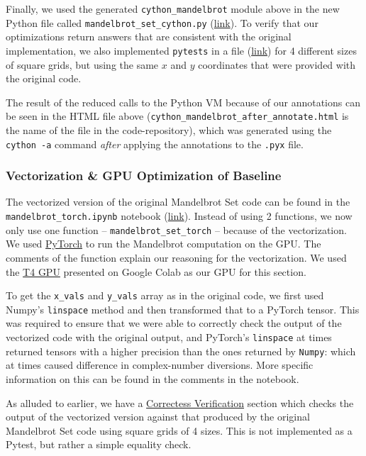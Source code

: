 \documentclass[a4paper,12pt]{article}
\begin{document}
Finally, we used the generated \verb|cython_mandelbrot| module above in the new Python file called \verb|mandelbrot_set_cython.py| (\href{https://github.com/paulmyr/DD2358-HPC25/blob/master/03_compgpu/bonus/mandelbrot_set_cython.py}{link}). To verify that our optimizations return answers that are consistent with the original implementation, we also implemented \verb|pytests| in a file (\href{https://github.com/paulmyr/DD2358-HPC25/blob/master/03_compgpu/bonus/mandelbrot_cython_default_test.py}{link}) for 4 different sizes of square grids, but using the same $x$ and $y$ coordinates that were provided with the original code. 

The result of the reduced calls to the Python VM because of our annotations can be seen in the HTML file above (\verb|cython_mandelbrot_after_annotate.html| is the name of the file in the code-repository), which was generated using the \verb|cython -a| command \textit{after} applying the annotations to the \verb|.pyx| file.

\subsubsection{Vectorization \& GPU Optimization of Baseline}
The vectorized version of the original Mandelbrot Set code can be found in the \verb|mandelbrot_torch.ipynb| notebook (\href{https://github.com/paulmyr/DD2358-HPC25/blob/master/03_compgpu/bonus/mandelbrot_torch.ipynb}{link}). Instead of using 2 functions, we now only use one function -- \verb|mandelbrot_set_torch| -- because of the vectorization. We used \underline{PyTorch} to run the Mandelbrot computation on the GPU. The comments of the function explain our reasoning for the vectorization. We used the \underline{T4 GPU} presented on Google Colab as our GPU for this section.

To get the \verb|x_vals| and \verb|y_vals| array as in the original code, we first used Numpy's \verb|linspace| method and then transformed that to a PyTorch tensor. This was required to ensure that we were able to correctly check the output of the vectorized code with the original output, and PyTorch's \verb|linspace| at times returned tensors with a higher precision than the ones returned by \verb|Numpy|: which at times caused difference in complex-number diversions. More specific information on this can be found in the comments in the notebook. 

As alluded to earlier, we have a \underline{Correctess Verification} section which checks the output of the vectorized version against that produced by the original Mandelbrot Set code using square grids of 4 sizes. This is not implemented as a Pytest, but rather a simple equality check. 
\end{document}
